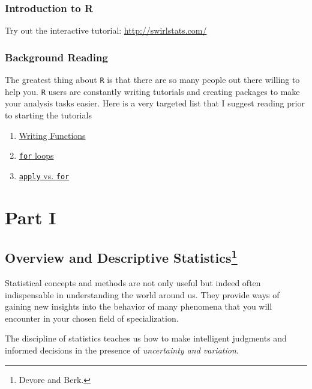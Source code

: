\documentclass[]{book}
\providecommand{\tightlist}{%
  \setlength{\itemsep}{0pt}\setlength{\parskip}{0pt}}
\let\rmarkdownfootnote\footnote%
\def\footnote{\protect\rmarkdownfootnote}
\providecommand{\tightlist}{%
  \setlength{\itemsep}{0pt}\setlength{\parskip}{0pt}}
\theoremstyle{definition}
\theoremstyle{definition}
\theoremstyle{definition}
\theoremstyle{remark}
\begin{document}
\section*{Introduction to R}\label{introduction-to-r}

Try out the interactive tutorial: \url{http://swirlstats.com/}

\section*{Background Reading}\label{background-reading}

The greatest thing about \texttt{R} is that there are so many people out
there willing to help you. \texttt{R} users are constantly writing
tutorials and creating packages to make your analysis tasks easier. Here
is a very targeted list that I suggest reading prior to starting the
tutorials

\begin{enumerate}
\def\labelenumi{\arabic{enumi}.}
\tightlist
\item
  \href{http://r4ds.had.co.nz/functions.html}{Writing Functions}
\item
  \href{http://r4ds.had.co.nz/iteration.html}{\texttt{for} loops}
\item
  \href{https://kbroman.wordpress.com/2013/04/02/apply-vs-for/}{\texttt{apply}
  vs. \texttt{for}}
\end{enumerate}

\part{Part I}\label{part-part-i}

\chapter[Overview and Descriptive Statistics]{\texorpdfstring{Overview
and Descriptive Statistics\footnote{Devore and Berk.}}{Overview and Descriptive Statistics}}\label{intro}

Statistical concepts and methods are not only useful but indeed often
indispensable in understanding the world around us. They provide ways of
gaining new insights into the behavior of many phenomena that you will
encounter in your chosen field of specialization.

The discipline of statistics teaches us how to make intelligent
judgments and informed decisions in the presence of \emph{uncertainty
and variation}.
\end{document}
